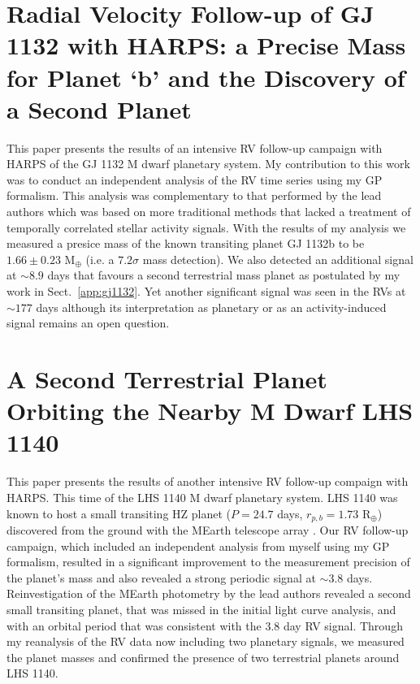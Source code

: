 \section{Radial Velocity Follow-up of GJ 1132 with HARPS: a Precise Mass for
  Planet `b' and the Discovery of a Second Planet \citep{bonfils18}}
\label{sect:gj1132bonfils}
This paper presents the results of an intensive RV follow-up campaign with HARPS
of the GJ 1132 M dwarf
planetary system. My contribution to this work was to conduct an
independent analysis of the RV time series using my GP formalism. This analysis
was complementary to that performed by the lead authors which was based on more
traditional methods that lacked a treatment of temporally correlated stellar
activity signals. With the results of my analysis we measured a presice mass of
the known transiting planet GJ 1132b to be $1.66\pm 0.23$ M$_{\oplus}$ (i.e. a
$7.2\sigma$ mass detection). We also detected an additional signal at $\sim 8.9$
days that favours a second terrestrial mass planet as postulated by my work in
Sect.~\ref{app:gj1132}. Yet another significant signal was seen in the RVs at
$\sim 177$ days although its interpretation as planetary or as an
activity-induced signal remains an open question.


\section{A Second Terrestrial Planet Orbiting the Nearby M Dwarf LHS 1140
  \citep{ment19}}
This paper presents the results of another intensive RV follow-up compaign with
HARPS. This time of the LHS 1140 M dwarf planetary system. LHS 1140 was known to
host a small transiting HZ planet ($P=24.7$ days, $r_{p,b}=1.73$ R$_{\oplus}$)
discovered from the ground with the MEarth
telescope array \citep{dittmann17a}. Our RV follow-up campaign, which included
an independent analysis from myself using my GP formalism, resulted in a
significant improvement to the measurement precision of the planet's mass and
also revealed a strong periodic signal at $\sim 3.8$ days. Reinvestigation of
the MEarth photometry by the lead authors revealed a second small transiting
planet, that was missed in the initial light curve analysis, and with an orbital
period that was consistent with the 3.8 day RV signal. Through my reanalysis of
the RV data now including two planetary signals, we measured the planet masses
and confirmed the presence of two terrestrial planets around LHS 1140.


